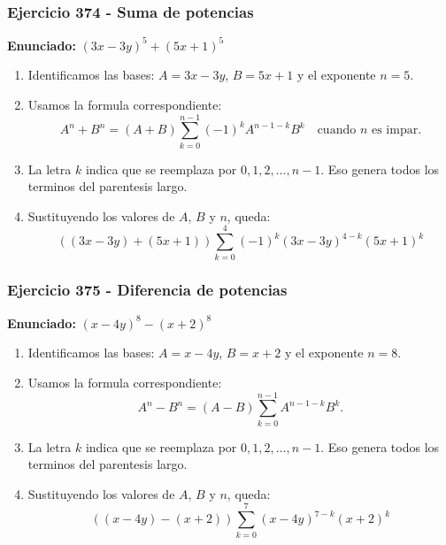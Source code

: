 \documentclass[11pt,a4paper]{article}
\begin{document}
\subsubsection*{Ejercicio 374 - Suma de potencias}
\textbf{Enunciado:} $ \left(3 x - 3 y\right)^{5}+\left(5 x + 1\right)^{5} $\par
\begin{enumerate}[leftmargin=2em]
\item Identificamos las bases: \(A=3 x - 3 y\), \(B=5 x + 1\) y el exponente \(n=5\).
\item Usamos la formula correspondiente: \[A^n+B^n=(A+B)\sum_{k=0}^{n-1}(-1)^kA^{n-1-k}B^k\quad\text{cuando }n\text{ es impar}.\]
\item La letra \(k\) indica que se reemplaza por \(0,1,2,\ldots,n-1\). Eso genera todos los terminos del parentesis largo.
\item Sustituyendo los valores de \(A\), \(B\) y \(n\), queda: \[\boxed{\left(\left(3 x - 3 y\right)+\left(5 x + 1\right)\right)\sum_{k=0}^{4}(-1)^k\left(3 x - 3 y\right)^{4-k}\left(5 x + 1\right)^k}\]
\end{enumerate}

\vspace{0.2cm}
\subsubsection*{Ejercicio 375 - Diferencia de potencias}
\textbf{Enunciado:} $ \left(x - 4 y\right)^{8}-\left(x + 2\right)^{8} $\par
\begin{enumerate}[leftmargin=2em]
\item Identificamos las bases: \(A=x - 4 y\), \(B=x + 2\) y el exponente \(n=8\).
\item Usamos la formula correspondiente: \[A^n-B^n=(A-B)\sum_{k=0}^{n-1}A^{n-1-k}B^k.\]
\item La letra \(k\) indica que se reemplaza por \(0,1,2,\ldots,n-1\). Eso genera todos los terminos del parentesis largo.
\item Sustituyendo los valores de \(A\), \(B\) y \(n\), queda: \[\boxed{\left(\left(x - 4 y\right)-\left(x + 2\right)\right)\sum_{k=0}^{7}\left(x - 4 y\right)^{7-k}\left(x + 2\right)^k}\]
\end{enumerate}

\vspace{0.2cm}
\end{document}
